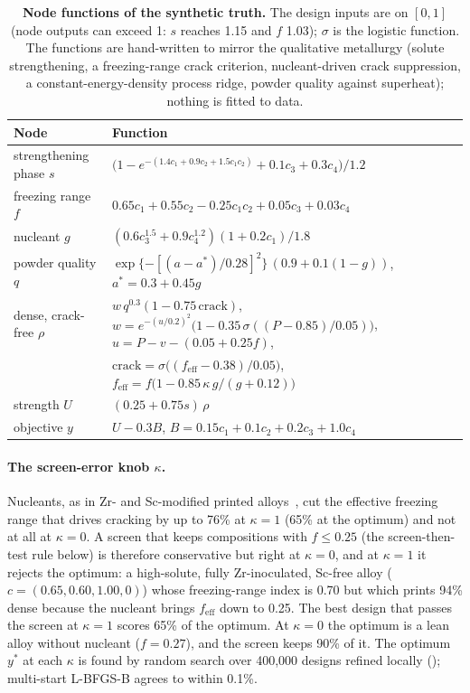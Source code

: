 \documentclass[11pt]{article}
\begin{document}
\begin{table}[t]
\centering
\small
\caption{\textbf{Node functions of the synthetic truth.} The design inputs are on
$[0,1]$ (node outputs can exceed 1: $s$ reaches 1.15 and $f$ 1.03); $\sigma$ is
the logistic function. The functions are hand-written to
mirror the qualitative metallurgy (solute strengthening, a freezing-range crack
criterion, nucleant-driven crack suppression, a constant-energy-density process
ridge, powder quality against superheat); nothing is fitted to data.}
\label{tab:nodes}
\begin{tabularx}{\linewidth}{@{}l>{\raggedright\arraybackslash}X@{}}
\toprule
Node & Function \\
\midrule
strengthening phase $s$ & $\bigl(1-e^{-(1.4c_1+0.9c_2+1.5c_1c_2)}+0.1c_3+0.3c_4\bigr)/1.2$ \\
freezing range $f$ & $0.65c_1+0.55c_2-0.25c_1c_2+0.05c_3+0.03c_4$ \\
nucleant $g$ & $(0.6c_3^{1.5}+0.9c_4^{1.2})(1+0.2c_1)/1.8$ \\
powder quality $q$ & $\exp\{-[(a-a^*)/0.28]^2\}\,(0.9+0.1(1-g))$, \quad $a^*=0.3+0.45g$ \\
dense, crack-free $\rho$ & $w\,q^{0.3}(1-0.75\,\mathrm{crack})$, \quad
$w=e^{-(u/0.2)^2}\bigl(1-0.35\,\sigma((P-0.85)/0.05)\bigr)$, \quad $u=P-v-(0.05+0.25f)$, \\
& $\mathrm{crack}=\sigma\bigl((f_\mathrm{eff}-0.38)/0.05\bigr)$, \quad
$f_\mathrm{eff}=f\bigl(1-0.85\,\kappa\,g/(g+0.12)\bigr)$ \\
strength $U$ & $(0.25+0.75s)\,\rho$ \\
objective $y$ & $U-0.3B$, \quad $B=0.15c_1+0.1c_2+0.2c_3+1.0c_4$ \\
\bottomrule
\end{tabularx}
\end{table}

\paragraph{The screen-error knob $\kappa$.} Nucleants, as in Zr- and Sc-modified
printed alloys~\cite{croteau2018,schmidtke2011}, cut the effective freezing
range that drives cracking by up to 76\% at $\kappa=1$ (65\% at the optimum)
and not at all at $\kappa=0$. A screen that keeps compositions with $f\le0.25$ (the
screen-then-test rule below) is therefore conservative but right at $\kappa=0$,
and at $\kappa=1$ it rejects the optimum: a high-solute, fully Zr-inoculated,
Sc-free alloy ($c=(0.65,0.60,1.00,0)$) whose freezing-range index is 0.70 but
which prints 94\% dense because the nucleant brings $f_\mathrm{eff}$ down to
0.25. The best design that passes the screen at $\kappa=1$ scores 65\% of the
optimum. At $\kappa=0$ the optimum is a lean alloy without nucleant
($f=0.27$), and the screen keeps 90\% of it. The optimum $y^*$ at each $\kappa$
is found by random search over 400,000 designs refined locally
(); multi-start L-BFGS-B agrees to within 0.1\%.
\end{document}

